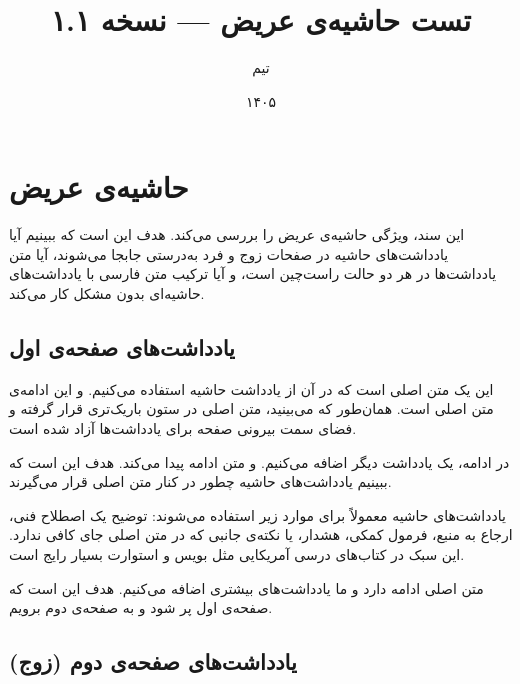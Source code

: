 \documentclass{matinbook}
\title{تست حاشیه‌ی عریض — نسخه ۱.۱}
\author{تیم \lr{MatinBook}}
\date{۱۴۰۵}
\begin{document}
\maketitle

\chapter{حاشیه‌ی عریض}
\label{chap:margin-test}

این سند، ویژگی حاشیه‌ی عریض  را بررسی می‌کند.
هدف این است که ببینیم آیا یادداشت‌های حاشیه در صفحات زوج و فرد
به‌درستی جابجا می‌شوند، آیا متن یادداشت‌ها در هر دو حالت راست‌چین
است، و آیا ترکیب متن فارسی با یادداشت‌های حاشیه‌ای بدون مشکل
کار می‌کند.

\section{یادداشت‌های صفحه‌ی اول}
\label{sec:page-1}

این یک متن اصلی است که در آن از یادداشت حاشیه استفاده می‌کنیم.
و این ادامه‌ی متن اصلی است. همان‌طور که می‌بینید، متن اصلی
در ستون باریک‌تری قرار گرفته و فضای سمت بیرونی صفحه برای
یادداشت‌ها آزاد شده است.

در ادامه، یک یادداشت دیگر اضافه می‌کنیم.
و متن ادامه پیدا می‌کند. هدف این است که ببینیم یادداشت‌های
حاشیه چطور در کنار متن اصلی قرار می‌گیرند.

یادداشت‌های حاشیه معمولاً برای موارد زیر استفاده می‌شوند:
توضیح یک اصطلاح فنی، ارجاع به منبع، فرمول کمکی، هشدار،
یا نکته‌ی جانبی که در متن اصلی جای کافی ندارد.
این سبک در کتاب‌های درسی آمریکایی مثل بویس و استوارت
بسیار رایج است.

متن اصلی ادامه دارد و ما یادداشت‌های بیشتری اضافه می‌کنیم.
هدف این است که صفحه‌ی اول پر شود و به صفحه‌ی دوم برویم.

\section{یادداشت‌های صفحه‌ی دوم (زوج)}
\label{sec:page-2}
\end{document}
